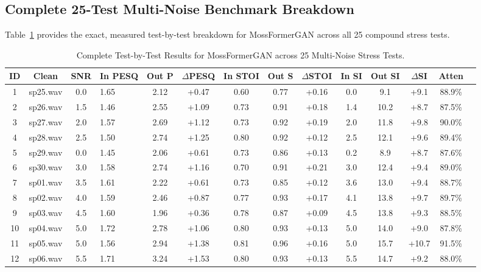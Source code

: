 \documentclass[11pt,a4paper]{report}
\begin{document}
\subsection{Complete 25-Test Multi-Noise Benchmark Breakdown}
Table~\ref{tab:full_25_tests} provides the exact, measured test-by-test breakdown for MossFormerGAN across all 25 compound stress tests.

\begin{table}[H]
\centering
\caption{Complete Test-by-Test Results for MossFormerGAN across 25 Multi-Noise Stress Tests.}
\label{tab:full_25_tests}
\scriptsize
\begin{tabularx}{\textwidth}{ccclcccccccccc}
\toprule
\textbf{ID} & \textbf{Clean} & \textbf{SNR} & \textbf{In PESQ} & \textbf{Out P} & \textbf{$\Delta$PESQ} & \textbf{In STOI} & \textbf{Out S} & \textbf{$\Delta$STOI} & \textbf{In SI} & \textbf{Out SI} & \textbf{$\Delta$SI} & \textbf{Atten} \\
\midrule
1 & sp25.wav & 0.0 & 1.65 & 2.12 & +0.47 & 0.60 & 0.77 & +0.16 & 0.0 & 9.1 & +9.1 & 88.9\% \\
2 & sp26.wav & 1.5 & 1.46 & 2.55 & +1.09 & 0.73 & 0.91 & +0.18 & 1.4 & 10.2 & +8.7 & 87.5\% \\
3 & sp27.wav & 2.0 & 1.57 & 2.69 & +1.12 & 0.73 & 0.92 & +0.19 & 2.0 & 11.8 & +9.8 & 90.0\% \\
4 & sp28.wav & 2.5 & 1.50 & 2.74 & +1.25 & 0.80 & 0.92 & +0.12 & 2.5 & 12.1 & +9.6 & 89.4\% \\
5 & sp29.wav & 0.0 & 1.45 & 2.06 & +0.61 & 0.73 & 0.86 & +0.13 & 0.2 & 8.9 & +8.7 & 87.6\% \\
6 & sp30.wav & 3.0 & 1.58 & 2.74 & +1.16 & 0.70 & 0.91 & +0.21 & 3.0 & 12.4 & +9.4 & 89.0\% \\
7 & sp01.wav & 3.5 & 1.61 & 2.22 & +0.61 & 0.73 & 0.85 & +0.12 & 3.6 & 13.0 & +9.4 & 88.7\% \\
8 & sp02.wav & 4.0 & 1.59 & 2.46 & +0.87 & 0.77 & 0.93 & +0.17 & 4.1 & 13.8 & +9.7 & 89.7\% \\
9 & sp03.wav & 4.5 & 1.60 & 1.96 & +0.36 & 0.78 & 0.87 & +0.09 & 4.5 & 13.8 & +9.3 & 88.5\% \\
10 & sp04.wav & 5.0 & 1.72 & 2.78 & +1.06 & 0.80 & 0.93 & +0.13 & 5.0 & 14.0 & +9.0 & 87.8\% \\
11 & sp05.wav & 5.0 & 1.56 & 2.94 & +1.38 & 0.81 & 0.96 & +0.16 & 5.0 & 15.7 & +10.7 & 91.5\% \\
12 & sp06.wav & 5.5 & 1.71 & 3.24 & +1.53 & 0.80 & 0.93 & +0.13 & 5.5 & 14.7 & +9.2 & 88.0\% \\

\end{tabularx}
\end{table}
\end{document}
